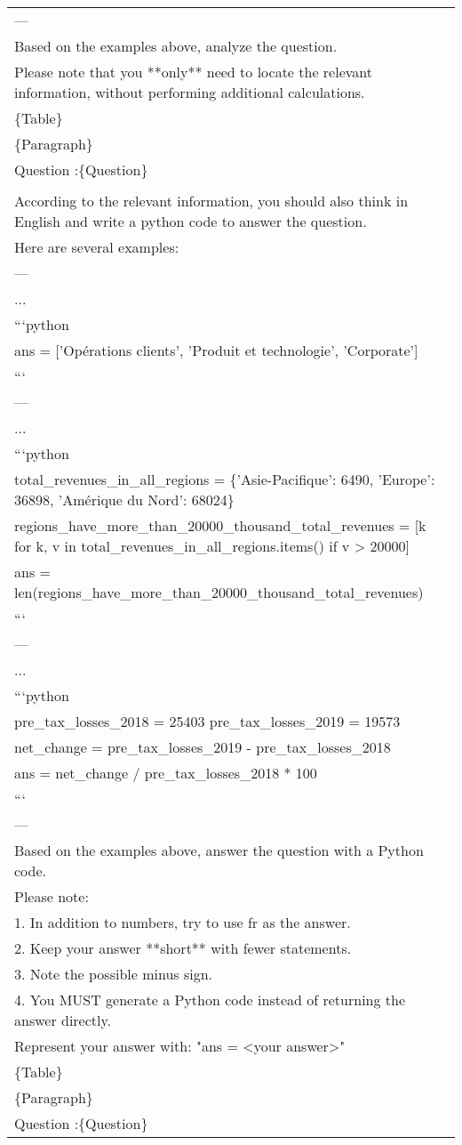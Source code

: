 \begin{tabular}{p{}}
---\\
Based on the examples above, analyze the question.\\
Please note that you **only** need to locate the relevant information, without performing additional calculations.\\
\{Table\}\\
\{Paragraph\}\\
Question :\{Question\}\\
\\
According to the relevant information, you should also think in English and write a python code to answer the question.\\
Here are several examples:\\
---\\
...\\
```python\\
ans = ['Opérations clients', 'Produit et technologie', 'Corporate']\\
```\\
---\\
...\\
```python\\
total\_revenues\_in\_all\_regions = \{'Asie-Pacifique': 6490, 'Europe': 36898, 'Amérique du Nord': 68024\}\\
regions\_have\_more\_than\_20000\_thousand\_total\_revenues = [k for k, v in total\_revenues\_in\_all\_regions.items() if v > 20000]\\
ans = len(regions\_have\_more\_than\_20000\_thousand\_total\_revenues)\\
```\\
---\\
...\\
```python\\
pre\_tax\_losses\_2018 = 25403  pre\_tax\_losses\_2019 = 19573\\
net\_change = pre\_tax\_losses\_2019 - pre\_tax\_losses\_2018\\
ans = net\_change / pre\_tax\_losses\_2018 * 100\\
```\\
---\\
Based on the examples above, answer the question with a Python code.\\
Please note:\\
1. In addition to numbers, try to use fr as the answer.\\
2. Keep your answer **short** with fewer statements.\\
3. Note the possible minus sign.\\
4. You MUST generate a Python code instead of returning the answer directly.\\
Represent your answer with: "ans = <your answer>"\\
\{Table\}\\
\{Paragraph\}\\
Question :\{Question\}\\
\bottomrule
\end{tabular}